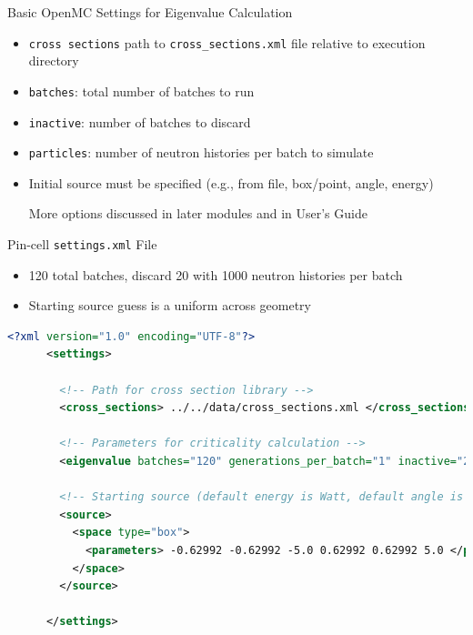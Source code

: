 \documentclass[serif]{beamer}
\begin{document}

\begin{frame}{Basic OpenMC Settings for Eigenvalue Calculation}

  \begin{itemize}

    \item<1-> \texttt{\color{darkblue}cross sections} path 
              to \texttt{cross\_sections.xml} file relative to execution directory\vfill
    \item<1-> \texttt{\color{darkblue}batches}: total number of batches to run\vfill
    \item<1-> \texttt{\color{darkblue}inactive}: number of batches to discard\vfill
    \item<1-> \texttt{\color{darkblue}particles}: number of neutron histories
              per batch to simulate\vfill
    \item<1-> Initial source must be specified (e.g., from file, box/point, angle, energy)\vfill
    \begin{center}
      \alert{More options discussed in later modules and in User's Guide}
    \end{center}

  \end{itemize}

\end{frame}


\begin{frame}[fragile]{Pin-cell \texttt{settings.xml} File}

  \begin{itemize}
    \item 120 total batches, discard 20 with 1000 neutron histories per batch
    \item Starting source guess is a uniform across geometry
  \end{itemize}
  \vfill
  \begin{scriptsize}
    \begin{lstlisting}[language=XML,gobble=4]
      <?xml version="1.0" encoding="UTF-8"?>
      <settings>

        <!-- Path for cross section library -->
        <cross_sections> ../../data/cross_sections.xml </cross_sections>

        <!-- Parameters for criticality calculation -->
        <eigenvalue batches="120" generations_per_batch="1" inactive="20" particles="1000" />

        <!-- Starting source (default energy is Watt, default angle is isotropic) -->
        <source>
          <space type="box">
            <parameters> -0.62992 -0.62992 -5.0 0.62992 0.62992 5.0 </parameters>
          </space>
        </source>

      </settings>
    \end{lstlisting}
  \end{scriptsize}
  \vfill
\end{frame}
\end{document}
